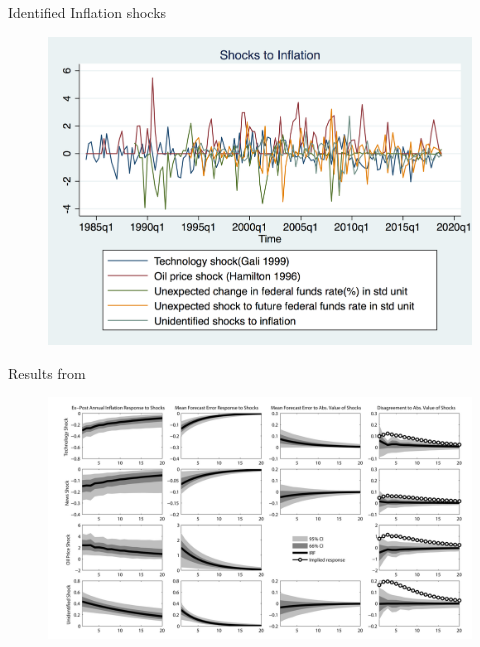 \documentclass{beamer}
\begin{document}
\begin{frame}{Identified Inflation shocks}

\begin{figure}
	\includegraphics[scale=0.3]{figures/inf_shocksQ.png} 
\end{figure}

\end{frame}

\begin{frame}{Results from \cite{coibion2012can}}

\begin{figure}
	\includegraphics[scale=0.3]{figures/RigidityJPEFigure2.png} 
\end{figure}

\end{frame}
\end{document}

